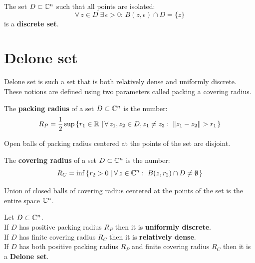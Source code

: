 \documentclass[text.tex]{subfiles}
\begin{document}
\begin{definition}
The set $D\subset \mathbb{C}^n$ such that all points are isolated: 
$$\forall\, z\in D\;\exists\, \epsilon>0:\, B(z,\epsilon)\cap D = \{z\}$$
is a \textbf{discrete set}.
\end{definition}

\section{Delone set} %
Delone set is such a set that is both relatively dense and uniformly discrete. These notions are defined using two parameters called packing a covering radius.

\begin{definition}\label{def_deloneSetPacking}
The \textbf{packing radius} of a set $D\subset \mathbb{C}^n$ is the number: 
$$R_P = \frac{1}{2}\sup\left\{ r_1\in \mathbb{R}\,\left|\, \forall\, z_1,z_2\in D, z_1\neq z_2:\; \lVert z_1-z_2\rVert >r_1 \right. \right\}$$
\end{definition}

\begin{remark}
Open balls of packing radius centered at the points of the set are disjoint. 
\end{remark}

\begin{definition}\label{def_deloneSetCovering}
The \textbf{covering radius} of a set $D\subset \mathbb{C}^n$ is the number: 
$$R_C = \inf\left\{ r_2>0\,\left|\, \forall\, z\in\mathbb{C}^n:\; B(z,r_2)\cap D \neq \emptyset \right. \right\}$$
\end{definition}

\begin{remark}
Union of closed balls of covering radius centered at the points of the set is the entire space $\mathbb{C}^n$. 
\end{remark}

\begin{definition}\label{def_deloneSet}
Let $D\subset \mathbb{C}^n$.\\
If $D$ has positive packing radius $R_P$ then it is \textbf{uniformly discrete}.\\
If $D$ has finite covering radius $R_C$ then it is \textbf{relatively dense}.\\
If $D$ has both positive packing radius $R_P$ and finite covering radius $R_C$ then it is a \textbf{Delone set}.
\end{definition}
\end{document}
